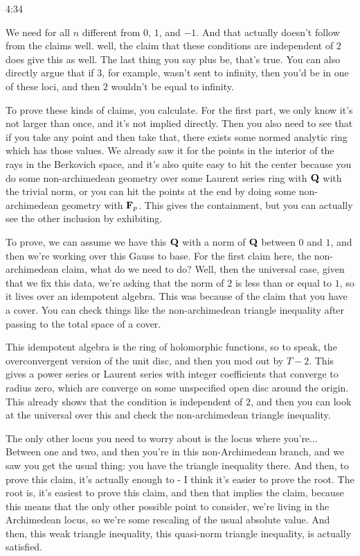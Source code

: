 \begin{unfinished}{4:34}
\begin{example}
\begin{example}
\begin{example}
We need for all $n$ different from $0$, $1$, and $-1$. And that actually doesn't follow from the claims well. well, the claim that these conditions are independent of $2$ does give this as well. The last thing you say plus be, that's true. You can also directly argue that if $3$, for example, wasn't sent to infinity, then you'd be in one of these loci, and then $2$ wouldn't be equal to infinity.

To prove these kinds of claims, you calculate. For the first part, we only know it's not larger than once, and it's not implied directly. Then you also need to see that if you take any point and then take that, there exists some normed analytic ring which has those values. We already saw it for the points in the interior of the rays in the Berkovich space, and it's also quite easy to hit the center because you do some non-archimedean geometry over some Laurent series ring with $\mathbf Q$ with the trivial norm, or you can hit the points at the end by doing some non-archimedean geometry with $\mathbf F_p$. This gives the containment, but you can actually see the other inclusion by exhibiting.

To prove, we can assume we have this $\mathbf Q$ with a norm of $\mathbf Q$ between $0$ and $1$, and then we're working over this Gauss to base. For the first claim here, the non-archimedean claim, what do we need to do? Well, then the universal case, given that we fix this data, we're asking that the norm of $2$ is less than or equal to $1$, so it lives over an idempotent algebra. This was because of the claim that you have a cover. You can check things like the non-archimedean triangle inequality after passing to the total space of a cover.

This idempotent algebra is the ring of holomorphic functions, so to speak, the overconvergent version of the unit disc, and then you mod out by $T - 2$. This gives a power series or Laurent series with integer coefficients that converge to radius zero, which are converge on some unspecified open disc around the origin. This already shows that the condition is independent of $2$, and then you can look at the universal over this and check the non-archimedean triangle inequality.

The only other locus you need to worry about is the locus where you're...
Between one and two, and then you're in this non-Archimedean branch, and we saw you get the usual thing: you have the triangle inequality there. And then, to prove this claim, it's actually enough to - I think it's easier to prove the root. The root is, it's easiest to prove this claim, and then that implies the claim, because this means that the only other possible point to consider, we're living in the Archimedean locus, so we're some rescaling of the usual absolute value. And then, this weak triangle inequality, this quasi-norm triangle inequality, is actually satisfied.


\end{example}
\end{example}
\end{example}
\end{unfinished}
